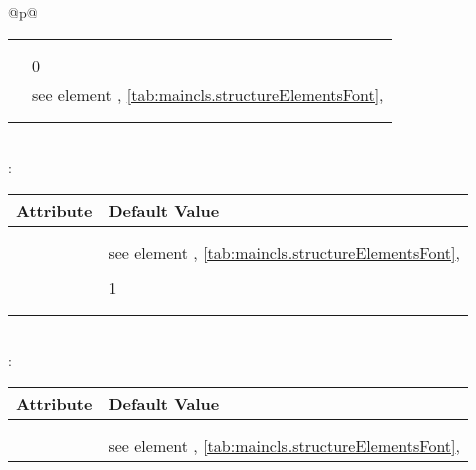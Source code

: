 \begin{longtable}{@{}p{\columnwidth}@{}}
\begin{tabularx}{\linewidth}{ll}
                           \autopageref{tab:maincls.structureElementsFont} \\
    \PValue{innerskip}   & \PValue{0pt} \\
    \PValue{level}       & 0 \\
    \PValue{prefixfont}  & see element \FontElement{chapterprefix},
                           \autoref{tab:maincls.structureElementsFont}, 
                           \autopageref{tab:maincls.structureElementsFont} \\
    \PValue{tocindent}   & \PValue{0pt} \\
    \PValue{tocnumwidth} & \PValue{1.5em} \\
    \bottomrule
    \end{tabularx} \\
    \addlinespace[\normalbaselineskip]
    : \\*
    \begin{tabularx}{\linewidth}{ll}
    \toprule
    Attribute & Default Value \\
    \midrule
    \PValue{afterskip}   & \PValue{2.3ex plus .2ex} \\
    \PValue{beforeskip}  & \PValue{-3.5ex plus -1ex minus -.2ex} \\
    \PValue{font}        & see element \FontElement{section},
                           \autoref{tab:maincls.structureElementsFont}, 
                           \autopageref{tab:maincls.structureElementsFont} \\
    \PValue{indent}      & \PValue{0pt} \\
    \PValue{level}       & 1 \\
    \PValue{tocindent}   & \PValue{1.5em}\\
    \PValue{tocnumwidth} & \PValue{2.3em}\\
    \bottomrule
    \end{tabularx} \\
    \addlinespace[\normalbaselineskip]
    : \\*
    \begin{tabularx}{\linewidth}{ll}
    \toprule
    Attribute & Default Value \\
    \midrule\nopagebreak
    \PValue{afterskip}   & \PValue{1.5ex plus .2ex} \\
    \PValue{beforeskip}  & \PValue{-3.25ex plus -1ex minus -.2ex} \\
    \PValue{font}        & see element \FontElement{subsection},
                           \autoref{tab:maincls.structureElementsFont}, 

\end{tabularx}
\end{longtable}
